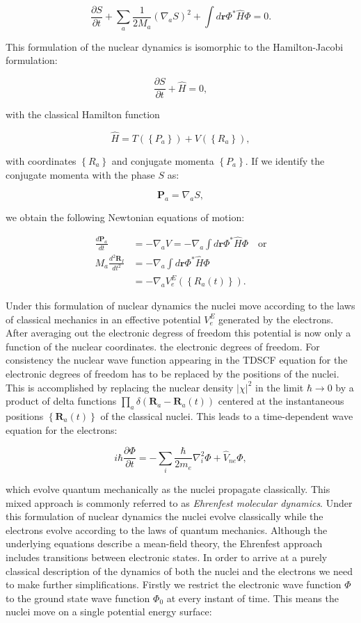 $$ \frac{\partial S}{\partial t} + \sum_a \frac{1}{2M_a}
    (\nabla_a S)^2 + \int d\bm{r} \Phi^* \hat{H} \Phi = 0 . $$

This formulation of the nuclear dynamics is isomorphic
to the Hamilton-Jacobi formulation:

$$ \frac{\partial S}{\partial t} + \hat{H} = 0 , $$

with the classical Hamilton function

$$ \hat{H} = T(\left\{P_a\right\}) + V(\left\{R_a\right\}) , $$

with coordinates $\left\{R_a\right\}$ and conjugate momenta 
$\left\{P_a\right\}$.
If we identify the conjugate momenta with the phase $S$ as:

$$ \bm{P}_a = \nabla_a S , $$

we obtain the following Newtonian equations of motion:

\begin{equation}
    \begin{split}
        \frac{d\bm{P}_a}{dt}
    &= -\nabla_a V
    = -\nabla_a \int d\bm{r} \Phi^* \hat{H} \Phi \quad \text{or} \\
        M_a\frac{d^2 \bm{R}_I}{dt^2}
    &= -\nabla_a \int d\bm{r} \Phi^* \hat{H} \Phi \\
    &= -\nabla_a V_e^E \left(\left\{ R_a(t) \right\}\right) .
    \end{split}
\end{equation}

Under this formulation of nuclear dynamics
the nuclei move according to the laws of classical
mechanics in an effective potential $V_e^E$ generated
by the electrons.
After averaging out the electronic degress of freedom
this potential is now only a function of the nuclear coordinates.
the electronic degrees of freedom.
For consistency the nuclear wave function appearing
in the TDSCF equation for the electronic
degrees of freedom has to be replaced by the positions
of the nuclei.
This is accomplished by replacing the nuclear density 
$\left| \chi \right|^2$ in the limit $\hbar \rightarrow 0$
by a product of delta functions
$ \prod_a \delta (\bm{R}_a - \bm{R}_a(t)) $ centered
at the instantaneous positions $\left\{ \bm{R}_a(t) \right\}$
of the classical nuclei.
This leads to a time-dependent wave equation
for the electrons:

$$ i\hbar\frac{\partial \Phi}{\partial t} =
    -\sum_i \frac{\hbar}{2m_e} \nabla_i^2 \Phi
    + \hat{V}_{ne} \Phi , $$

which evolve quantum mechanically as the nuclei propagate
classically. This mixed approach is commonly referred to as
\textit{Ehrenfest molecular dynamics}.
Under this formulation of nuclear dynamics the
nuclei evolve classically while the electrons
evolve according to the laws of quantum mechanics.
Although the underlying equations describe a mean-field
theory, the Ehrenfest approach includes transitions
between electronic states.
In order to arrive at a purely classical description of the
dynamics of both the nuclei and the electrons
we need to make further simplifications.
Firstly we restrict the electronic wave function $\Phi$
to the ground state wave function $\Phi_0$
at every instant of time. 
This means the nuclei move on a single potential energy surface:


